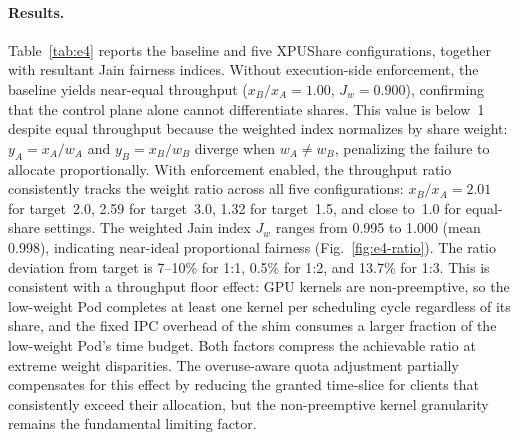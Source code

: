 \documentclass[runningheads,a4paper]{llncs}
\begin{document}
\paragraph{Results.}
Table~\ref{tab:e4} reports the baseline and five XPUShare configurations, together with resultant Jain fairness indices.
Without execution-side enforcement, the baseline yields near-equal
throughput ($x_B/x_A{=}1.00$, $J_w{=}0.900$), confirming that the control
plane alone cannot differentiate shares.
This value is below~1 despite equal throughput because the weighted index
normalizes by share weight: $y_A{=}x_A/w_A$ and $y_B{=}x_B/w_B$ diverge
when $w_A{\neq}w_B$, penalizing the failure to allocate proportionally.
With enforcement enabled, the
throughput ratio consistently tracks the weight ratio across all five
configurations: $x_B/x_A{=}2.01$ for target~2.0, 2.59 for target~3.0,
1.32 for target~1.5, and close to~1.0 for equal-share settings. The
weighted Jain index $J_w$ ranges from 0.995 to 1.000 (mean 0.998),
indicating near-ideal proportional fairness (Fig.~\ref{fig:e4-ratio}).
The ratio deviation from target is 7--10\% for 1{:}1,
	0.5\% for 1{:}2, and 13.7\% for 1{:}3. This is consistent with a
	throughput floor effect: GPU kernels are non-preemptive, so the
	low-weight Pod completes at least one kernel per scheduling cycle
	regardless of its share, and the fixed IPC overhead of the shim
	consumes a larger fraction of the low-weight Pod's time budget.
	Both factors compress the achievable ratio at extreme weight
	disparities. The overuse-aware quota adjustment partially
	compensates for this effect by reducing the granted time-slice for
	clients that consistently exceed their allocation, but the
	non-preemptive kernel granularity remains the fundamental limiting
	factor.
\end{document}
